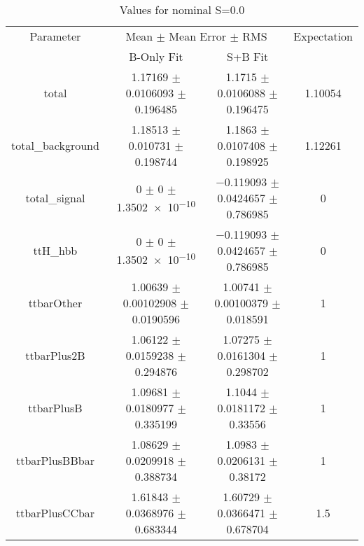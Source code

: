 \begin{table}
\centering
\caption{Values for nominal S=0.0}
\begin{tabular}{cccc}
\toprule
Parameter & \multicolumn{2}{c}{Mean $\pm$ Mean Error $\pm$ RMS} & Expectation\\
 & B-Only Fit & S+B Fit & \\
\midrule
total & \num{1.17169} $\pm$ \num{0.0106093} $\pm$ \num{0.196485} & \num{1.1715} $\pm$ \num{0.0106088} $\pm$ \num{0.196475} & \num{1.10054}\\
total\_background & \num{1.18513} $\pm$ \num{0.010731} $\pm$ \num{0.198744} & \num{1.1863} $\pm$ \num{0.0107408} $\pm$ \num{0.198925} & \num{1.12261}\\
total\_signal & \num{0} $\pm$ \num{0} $\pm$ \num{1.3502e-10} & \num{-0.119093} $\pm$ \num{0.0424657} $\pm$ \num{0.786985} & \num{0}\\
ttH\_hbb & \num{0} $\pm$ \num{0} $\pm$ \num{1.3502e-10} & \num{-0.119093} $\pm$ \num{0.0424657} $\pm$ \num{0.786985} & \num{0}\\
ttbarOther & \num{1.00639} $\pm$ \num{0.00102908} $\pm$ \num{0.0190596} & \num{1.00741} $\pm$ \num{0.00100379} $\pm$ \num{0.018591} & \num{1}\\
ttbarPlus2B & \num{1.06122} $\pm$ \num{0.0159238} $\pm$ \num{0.294876} & \num{1.07275} $\pm$ \num{0.0161304} $\pm$ \num{0.298702} & \num{1}\\
ttbarPlusB & \num{1.09681} $\pm$ \num{0.0180977} $\pm$ \num{0.335199} & \num{1.1044} $\pm$ \num{0.0181172} $\pm$ \num{0.33556} & \num{1}\\
ttbarPlusBBbar & \num{1.08629} $\pm$ \num{0.0209918} $\pm$ \num{0.388734} & \num{1.0983} $\pm$ \num{0.0206131} $\pm$ \num{0.38172} & \num{1}\\
ttbarPlusCCbar & \num{1.61843} $\pm$ \num{0.0368976} $\pm$ \num{0.683344} & \num{1.60729} $\pm$ \num{0.0366471} $\pm$ \num{0.678704} & \num{1.5}\\
\bottomrule
\end{tabular}
\end{table}
